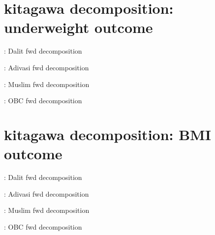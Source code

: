 \documentclass{article}
\begin{document}
\newpage
\section{kitagawa decomposition: underweight outcome}



\begin{table}[H]
    \centering
    \footnotesize %
    \caption{: Dalit fwd decomposition}
    \label{tab:sumstat}
\end{table}

\begin{table}[H]
    \centering
    \footnotesize %
    \caption{: Adivasi fwd decomposition}
    \label{tab:sumstat}
\end{table}



\begin{table}[H]
    \centering
    \footnotesize %
    \caption{: Muslim fwd decomposition}
    \label{tab:sumstat}
\end{table}

\begin{table}[H]
    \centering
    \footnotesize %
    \caption{: OBC fwd decomposition}
    \label{tab:sumstat}
\end{table}


\newpage
\section{kitagawa decomposition: BMI outcome}

\begin{table}[H]
    \centering
    \footnotesize %
    \caption{: Dalit fwd decomposition}
    \label{tab:sumstat}
\end{table}

\begin{table}[H]
    \centering
    \footnotesize %
    \caption{: Adivasi fwd decomposition}
    \label{tab:sumstat}
\end{table}



\begin{table}[H]
    \centering
    \footnotesize %
    \caption{: Muslim fwd decomposition}
    \label{tab:sumstat}
\end{table}

\begin{table}[H]
    \centering
    \footnotesize %
    \caption{: OBC fwd decomposition}
    \label{tab:sumstat}
\end{table}
\end{document}

